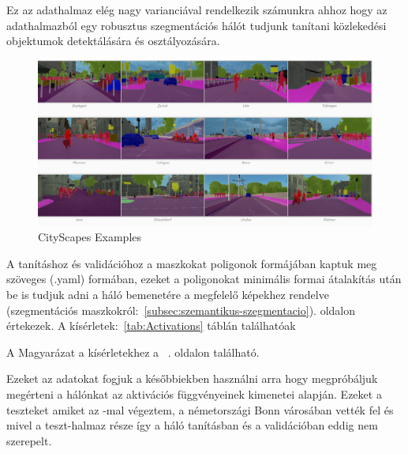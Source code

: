 \documentclass[12pt,oneside,a4paper]{article}
\theoremstyle{remark}
\begin{document}
    Ez az adathalmaz elég nagy
    varianciával rendelkezik számunkra ahhoz hogy az adathalmazból egy robusztus szegmentációs hálót tudjunk tanítani közlekedési objektumok detektálására és osztályozására.


    \begin{figure}[ht]
       \centering
        \noindent\includegraphics[width=1\linewidth]{cityscapes}
        \caption{CityScapes Examples}
        \label{fig:CityScapes-Examples}
    \end{figure}
    A tanításhoz és validációhoz a maszkokat poligonok formájában kaptuk meg szöveges (.yaml) formában, ezeket a poligonokat
    minimális formai átalakítás után be is tudjuk adni a háló bemenetére a megfelelő képekhez rendelve (szegmentációs
    maszkokról:~\ref{subsec:szemantikus-szegmentacio}). oldalon értekezek.
    A kísérletek:~\ref{tab:Activations} táblán találhatóak

    A Magyarázat a kísérletekhez a ~\pageref{subsec:magyarazat}\label{pageref}.
    oldalon található.

    Ezeket az adatokat fogjuk a későbbiekben használni arra hogy megpróbáljuk megérteni a hálónkat az aktivációs függvényeinek kimenetei
    alapján.
    Ezeket a teszteket amiket az -mal végeztem, a németországi Bonn városában vették fel és mivel a teszt-halmaz része így a háló tanításban és a validációban eddig nem szerepelt.
\end{document}
